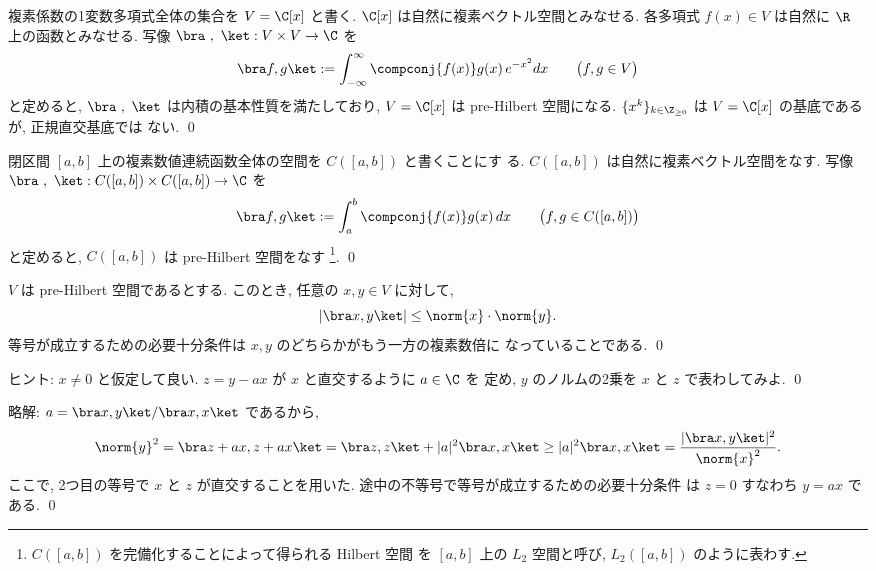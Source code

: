 \documentclass[12pt,twoside]{jarticle}
\newcommand\commentout[1]{#1}
\newcommand\commentout[1]{}
\begin{document}

\begin{question}
\label{q:Hermite-polyn-1}
  複素係数の1変数多項式全体の集合を $V = \C[x]$ と書く. 
  $\C[x]$ は自然に複素ベクトル空間とみなせる.
  各多項式 $f(x)\in V$ は自然に $\R$ 上の函数とみなせる.
  写像 $\bra\ ,\ \ket : V\times V\to\C$ を
  \begin{equation*}
    \bra f, g\ket := \int_{-\infty}^\infty \compconj{f(x)} g(x)\,e^{-x^2}dx
    \qquad \bigl(f,g\in V\bigr)
  \end{equation*}
  と定めると, $\bra\ ,\ \ket$ は内積の基本性質を満たしており, 
  $V = \C[x]$ は pre-Hilbert 空間になる. 
  $\{x^k\}_{k\in\Z_{\ge 0}}$ は $V = \C[x]$ の基底であるが, 正規直交基底では
  ない.
  \qed
\end{question}


\begin{question}
  閉区間 $[a,b]$ 上の複素数値連続函数全体の空間を $C([a,b])$ と書くことにす
  る. $C([a,b])$ は自然に複素ベクトル空間をなす.
  写像 $\bra\ ,\ \ket : C([a,b])\times C([a,b])\to\C$ を
  \begin{equation*}
    \bra f, g\ket := \int_a^b \compconj{f(x)} g(x)\,dx
    \qquad \bigl(f,g\in C([a,b])\bigr)
  \end{equation*}
  と定めると, $C([a,b])$ は pre-Hilbert 空間をなす%
  \footnote{$C([a,b])$ を完備化することによって得られる Hilbert 空間
    を $[a,b]$ 上の $L_2$ 空間と呼び, $L_2([a,b])$ のように表わす.}. \qed
\end{question}


\begin{question}
\label{q:Cauchy-Schwarz}
  $V$ は pre-Hilbert 空間であるとする. 
  このとき, 任意の $x,y\in V$ に対して,
  \begin{equation*}
    |\bra x, y\ket| \le \norm{x}\cdot\norm{y}.
  \end{equation*}
  等号が成立するための必要十分条件は $x,y$ のどちらかがもう一方の複素数倍に
  なっていることである.
  \qed
\end{question}

\noindent
ヒント: $x\ne0$ と仮定して良い.  
$z=y-ax$ が $x$ と直交するように $a\in\C$ を
定め, $y$ のノルムの2乗を $x$ と $z$ で表わしてみよ.
\qed

\commentout{
\medskip
\noindent
略解: $a = \bra x,y\ket/\bra x,x\ket$ であるから, 
\begin{equation*}
  \norm{y}^2
  = \bra z+ax, z+ax \ket
  = \bra z, z\ket + |a|^2 \bra x, x\ket
  \ge |a|^2 \bra x, x\ket
  = \frac{|\bra x,y\ket|^2}{\norm{x}^2}.
\end{equation*}
ここで, 2つ目の等号で $x$ と $z$ が直交することを用いた.
途中の不等号で等号が成立するための必要十分条件
は $z=0$ すなわち $y=ax$ である.
\qed
}
\end{document}
